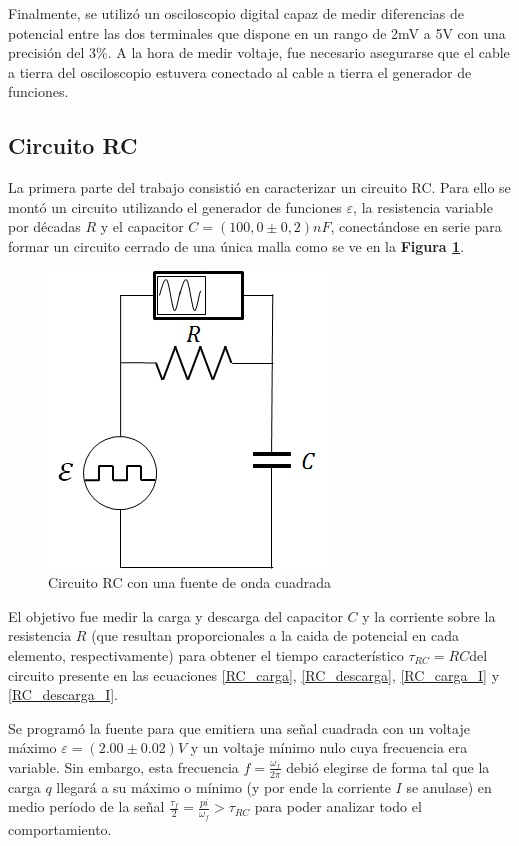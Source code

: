 \documentclass[11pt,a4paper]{article}
\begin{document}
Finalmente, se utilizó un osciloscopio digital capaz de medir diferencias de potencial entre las dos terminales que dispone en un rango de 2mV a 5V con una precisión del $3\%$. A la hora de medir voltaje, fue necesario asegurarse que el cable a tierra del osciloscopio estuvera conectado al cable a tierra el generador de funciones. 

\subsection{Circuito RC}

La primera parte del trabajo consistió en caracterizar un circuito RC. Para ello se montó un circuito utilizando el generador de funciones $\varepsilon$, la resistencia variable por décadas $R$ y el capacitor $C = (100,0 \pm 0,2)nF$, conectándose en serie para formar un circuito cerrado de una única malla como se ve en la \textbf{Figura \ref{fig:RC}}. 

\begin{figure}[h]
\centering
  \includegraphics[scale=0.7]{Circuito-RC}
  \caption{Circuito RC con una fuente de onda cuadrada}
  \label{fig:RC}
\end{figure}

El objetivo fue medir la carga y descarga del capacitor $C$ y la corriente sobre la resistencia $R$ (que resultan proporcionales a la caida de potencial en cada elemento, respectivamente) para obtener el tiempo característico $\tau_{RC} = RC$del circuito presente en las ecuaciones \eqref{RC_carga}, \eqref{RC_descarga}, \eqref{RC_carga_I} y \eqref{RC_descarga_I}.
 
Se programó la fuente para que emitiera una señal cuadrada con un voltaje máximo $\varepsilon = (2.00 \pm 0.02)V$ y un voltaje mínimo nulo cuya frecuencia era variable. Sin embargo, esta frecuencia $f = \frac{\omega_f}{2\pi}$ debió elegirse de forma tal que la carga $q$ llegará a su máximo o mínimo (y por ende la corriente $I$ se anulase) en medio período de la señal $\frac{\tau_f}{2} = \frac{pi}{\omega_f} > \tau_{RC}$ para poder analizar todo el comportamiento.
\end{document}
